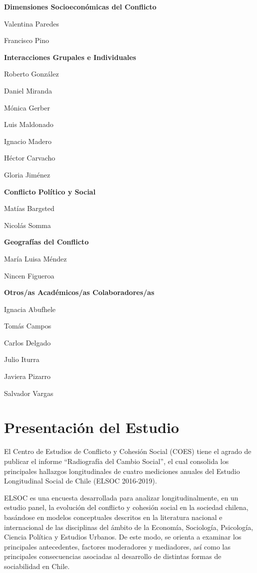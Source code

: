 \documentclass[
  12pt,
]{book}
\begin{document}
\textbf{Dimensiones Socioeconómicas del Conflicto}

Valentina Paredes

Francisco Pino

\textbf{Interacciones Grupales e Individuales}

Roberto González

Daniel Miranda

Mónica Gerber

Luis Maldonado

Ignacio Madero

Héctor Carvacho

Gloria Jiménez

\textbf{Conflicto Político y Social}

Matías Bargsted

Nicolás Somma

\textbf{Geografías del Conflicto}

María Luisa Méndez

Nincen Figueroa

\textbf{Otros/as Académicos/as Colaboradores/as}

Ignacia Abufhele

Tomás Campos

Carlos Delgado

Julio Iturra

Javiera Pizarro

Salvador Vargas

\hypertarget{presentaciuxf3n-del-estudio}{%
\section{Presentación del Estudio}\label{presentaciuxf3n-del-estudio}}

El Centro de Estudios de Conflicto y Cohesión Social (COES) tiene el agrado de publicar el informe ``Radiografía del Cambio Social'', el cual consolida los principales hallazgos longitudinales de cuatro mediciones anuales del Estudio Longitudinal Social de Chile (ELSOC 2016-2019).

ELSOC es una encuesta desarrollada para analizar longitudinalmente, en un estudio panel, la evolución del conflicto y cohesión social en la sociedad chilena, basándose en modelos conceptuales descritos en la literatura nacional e internacional de las disciplinas del ámbito de la Economía, Sociología, Psicología, Ciencia Política y Estudios Urbanos. De este modo, se orienta a examinar los principales antecedentes, factores moderadores y mediadores, así como las principales consecuencias asociadas al desarrollo de distintas formas de sociabilidad en Chile.
\end{document}
